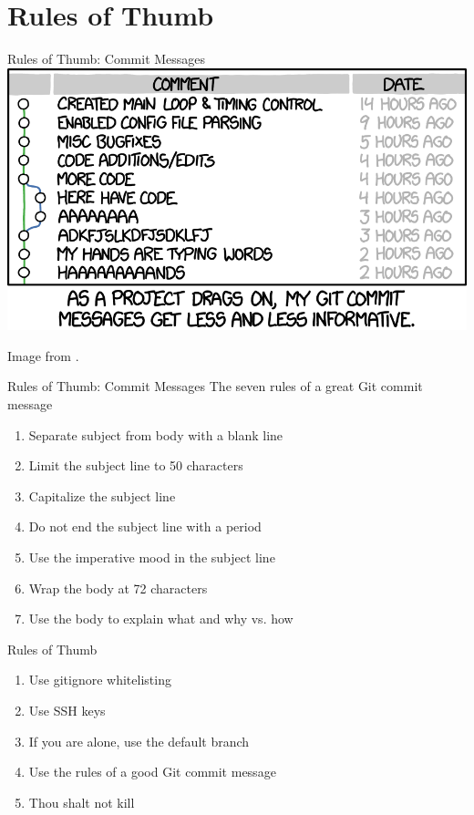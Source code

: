 \documentclass[aspectratio=169,fleqn]{beamer}
\begin{document}

\section{Rules of Thumb} %
\label{sec:rules_of_thumb}

  \begin{frame}{Rules of Thumb: Commit Messages}
    \centering
    \includegraphics[height=0.8\textheight]{images/bad-commit-messages.png}

    {\scriptsize Image from \textcite{good-commit-message}.}
  \end{frame}

  \begin{frame}{Rules of Thumb: Commit Messages}
    The seven rules of a great Git commit message
    \begin{enumerate}
      \item Separate subject from body with a blank line
      \item Limit the subject line to 50 characters
      \item Capitalize the subject line
      \item Do not end the subject line with a period
      \item Use the imperative mood in the subject line
      \item Wrap the body at 72 characters
      \item Use the body to explain what and why vs. how
    \end{enumerate}
  \end{frame}

  \begin{frame}{Rules of Thumb}
    \begin{enumerate}
      \item Use gitignore whitelisting
      \item Use SSH keys
      \item If you are alone, use the default branch
      \item Use the rules of a good Git commit message
      \item Thou shalt not kill
    \end{enumerate}
  \end{frame}
\end{document}
